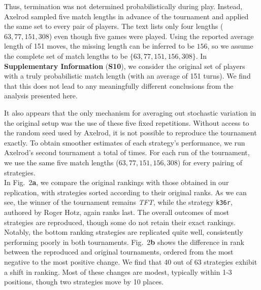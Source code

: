 \documentclass{article}
\newcommand{\TFT}{\emph{TFT}}
\newcommand{\SI}{\textbf{Supplementary Information}}
\begin{document}
Thus, termination was not determined probabilistically during play. Instead,
Axelrod sampled five match lengths in advance of the tournament and applied the
same set to every pair of players. The text lists only four lengths
(\(63, 77, 151, 308\)) even though five games were played. Using the reported
average length of 151 moves, the missing length can be inferred to be \(156\),
so we assume the complete set of match lengths to be \(\{63, 77, 151, 156, 308\}\).
In \SI{} (\textbf{S10}), we consider the original set of players with a truly
probabilistic match length (with an average of 151 turns). We find that this
does not lead to any meaningfully different conclusions from the analysis
presented here.

It also appears that the only mechanism for averaging out stochastic variation in
the original setup was the use of these five fixed repetitions. Without access to
the random seed used by Axelrod, it is not possible to reproduce the tournament
exactly. To obtain smoother estimates of each strategy's performance, we run
Axelrod's second tournament a total of  times.
For each run of the tournament, we use the same five match lengths
(\(63, 77, 151, 156, 308\)) for every pairing of strategies. \\

In Fig.~2\textbf{a}, we compare the original rankings with
those obtained in our replication, with strategies sorted according to their
original ranks. As we can see, the winner of the tournament remains \TFT, while the strategy
\texttt{k36r}, authored by Roger Hotz, again ranks last.
The overall outcomes of
most strategies are reproduced, though some do not retain their exact rankings.
Notably, the bottom ranking strategies are replicated quite well, consistently
performing poorly in both tournaments. Fig.~2\textbf{b}
shows the difference in rank between the reproduced and original tournaments,
ordered from the most negative to the most positive change. We find that 40 out
of 63 strategies exhibit a shift in ranking. Most of these changes are modest,
typically within 1-3 positions, though two strategies move by 10 places.
\end{document}
